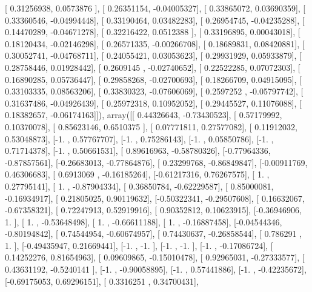 \documentclass{article}
\begin{document}
       [ 0.31256938,  0.0573876 ],
       [ 0.26351154, -0.04005327],
       [ 0.33865072,  0.03690359],
       [ 0.33360546, -0.04994448],
       [ 0.33190464,  0.03482283],
       [ 0.26954745, -0.04235288],
       [ 0.14470289, -0.04671278],
       [ 0.32216422,  0.0512388 ],
       [ 0.33196895,  0.00043018],
       [ 0.18120434, -0.02146298],
       [ 0.26571335, -0.00266708],
       [ 0.18689831,  0.08420881],
       [ 0.30052741, -0.04768711],
       [ 0.24055421,  0.03053623],
       [ 0.29931929,  0.05933879],
       [ 0.28758446,  0.01928442],
       [ 0.2609145 , -0.02740652],
       [ 0.22522285,  0.07072303],
       [ 0.16890285,  0.05736447],
       [ 0.29858268, -0.02700693],
       [ 0.18266709,  0.04915095],
       [ 0.33103335,  0.08563206],
       [ 0.33830323, -0.07606069],
       [ 0.2597252 , -0.05797742],
       [ 0.31637486, -0.04926439],
       [ 0.25972318,  0.10952052],
       [ 0.29445527,  0.11076088],
       [ 0.18382657, -0.06174163]]), array([[ 0.44326643, -0.73430523],
       [ 0.57179992,  0.10370078],
       [ 0.85623146,  0.6510375 ],
       [ 0.07771811,  0.27577082],
       [ 0.11912032,  0.53048873],
       [-1.        ,  0.57767707],
       [-1.        ,  0.75286143],
       [-1.        ,  0.05850786],
       [-1.        ,  0.71714378],
       [-1.        ,  0.50661531],
       [ 0.89616963, -0.58780326],
       [-0.77964336, -0.87857561],
       [-0.26683013, -0.77864876],
       [ 0.23299768, -0.86849847],
       [-0.00911769,  0.46306683],
       [ 0.6913069 , -0.16185264],
       [-0.61217316,  0.76267575],
       [ 1.        ,  0.27795141],
       [ 1.        , -0.87904334],
       [ 0.36850784, -0.62229587],
       [ 0.85000081, -0.16934917],
       [ 0.21805025,  0.90119632],
       [-0.50322341, -0.29507608],
       [ 0.16632067, -0.67358321],
       [ 0.72247913,  0.52919916],
       [ 0.90352812,  0.10623915],
       [-0.36946906,  1.        ],
       [ 1.        , -0.53648498],
       [ 1.        , -0.66611188],
       [ 1.        , -0.16887458],
       [-0.04544346, -0.80194842],
       [ 0.74544954, -0.60674957],
       [ 0.74430637, -0.26858544],
       [ 0.786291  ,  1.        ],
       [-0.49435947,  0.21669441],
       [-1.        , -1.        ],
       [-1.        , -1.        ],
       [-1.        , -0.17086724],
       [ 0.14252276,  0.81654963],
       [ 0.09609865, -0.15010478],
       [ 0.92965031, -0.27333577],
       [ 0.43631192, -0.5240141 ],
       [-1.        , -0.90058895],
       [-1.        ,  0.57441886],
       [-1.        , -0.42235672],
       [-0.69175053,  0.69296151],
       [ 0.3316251 ,  0.34700431],
\end{document}
